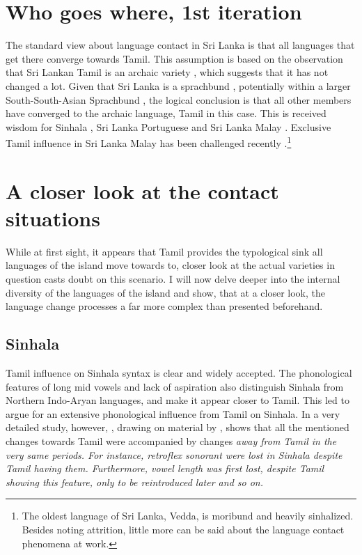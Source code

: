 \documentclass[handout,utf8]{article}
\begin{document}
\section{Who goes where, 1st iteration}
The standard view about language contact in Sri Lanka is that all languages that get there converge towards Tamil. This assumption is based on the observation that Sri Lankan Tamil is an archaic variety \citep{Zvelebil1959II}, which suggests that it has not changed a lot. Given that Sri Lanka is a sprachbund \citep{Bakker2012}, potentially within a larger South-South-Asian Sprachbund \citep{Gair2012}, the logical conclusion is that all other members have converged to the archaic language, Tamil in this case. This is received wisdom for Sinhala \citep{Geiger, Gair, Elizarenkova1972}, Sri Lanka Portuguese \citep{Smith, Jayasuriya} and Sri Lanka Malay \citep{Hussainmiya, Smith, Bakker}. Exclusive Tamil influence in Sri Lanka Malay has been challenged recently \citep{Ansaldo, Nordhoff}.\footnote{The oldest language of Sri Lanka, Vedda, is moribund and heavily sinhalized. Besides noting attrition, little more can be said about the language contact phenomena at work.}


\section{A closer look at the contact situations}
While at first sight, it appears that Tamil provides the typological sink all languages of the island move towards to, closer look at the actual varieties in question casts doubt on this scenario. I will now delve deeper into the internal diversity of the languages of the island and show, that at a closer look, the language change processes a far more complex than presented beforehand. 

\subsection{Sinhala}
Tamil influence on Sinhala syntax is clear and widely accepted. The phonological features of long mid vowels and lack of aspiration also distinguish Sinhala from Northern Indo-Aryan languages, and make it appear closer to Tamil. This led \citet{Elizarenkova1972} to argue for an extensive phonological influence from Tamil on Sinhala. In a very detailed study, however, \citet{Gair1976}, drawing on material by \citet{Karunatillake}, shows that all the mentioned changes towards Tamil were accompanied by changes \em away \em from Tamil in the very same periods. For instance, retroflex sonorant were lost in Sinhala despite Tamil having them. Furthermore, vowel length was first lost, despite Tamil showing this feature, only to be reintroduced later and so on.
\end{document}
